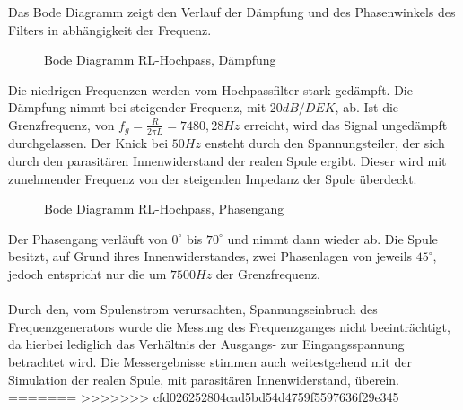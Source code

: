 Das Bode Diagramm zeigt den Verlauf der Dämpfung und des Phasenwinkels des Filters in abhängigkeit der Frequenz.\\
\begin{figure}[H]
  \centering
  \caption{Bode Diagramm RL-Hochpass, Dämpfung}
\end{figure}
\noindent
Die niedrigen Frequenzen werden vom Hochpassfilter stark gedämpft. Die Dämpfung nimmt bei steigender Frequenz, mit $20dB/DEK$, ab. Ist die Grenzfrequenz, von 
$f_g = \frac{R}{2\pi L} = 7480,28Hz$ erreicht, wird das Signal ungedämpft durchgelassen. Der Knick bei $50Hz$ ensteht durch den Spannungsteiler, der sich durch den
parasitären Innenwiderstand der realen Spule ergibt. Dieser wird mit zunehmender Frequenz von der steigenden Impedanz der Spule überdeckt.\\

\begin{figure}[H]
  \centering
  \caption{Bode Diagramm RL-Hochpass, Phasengang}
\end{figure}
\noindent
Der Phasengang verläuft von $0^\circ$ bis $70^\circ$ und nimmt dann wieder ab. Die Spule besitzt, auf Grund ihres Innenwiderstandes, zwei Phasenlagen von jeweils $45^\circ$, 
jedoch entspricht nur die um $7500Hz$ der Grenzfrequenz.\\
\\
Durch den, vom Spulenstrom verursachten, Spannungseinbruch des Frequenzgenerators wurde die Messung des Frequenzganges nicht beeinträchtigt, da hierbei lediglich
das Verhältnis der Ausgangs- zur Eingangsspannung betrachtet wird. Die Messergebnisse stimmen auch weitestgehend mit der Simulation der realen Spule, mit parasitären 
Innenwiderstand, überein. \\
=======
>>>>>>> cfd026252804cad5bd54d4759f5597636f29e345
